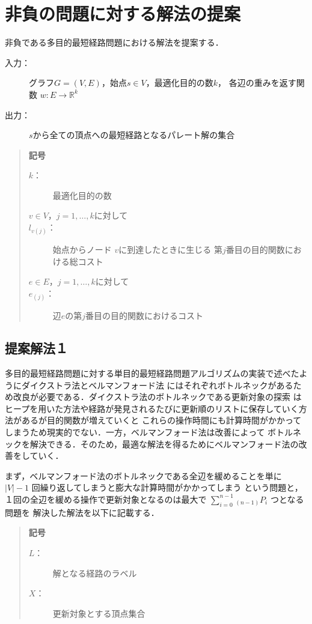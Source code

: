 \documentclass[12pt]{optlab-bachelor}
\begin{document}
\section{非負の問題に対する解法の提案}
非負である多目的最短経路問題における解法を提案する．
\begin{description}
  \item[入力：] グラフ$G=(V,E)$，始点$s \in V$，最適化目的の数$k$，
  各辺の重みを返す関数 $w : E \to \mathbb{R}^k$
  \item[出力：] $s$から全ての頂点への最短経路となるパレート解の集合
\end{description}
\begin{quote}
  \textbf{記号}
  \begin{description}
    \item[$k$：] 最適化目的の数
    \item[$v \in V$，$j = 1 , \ldots , k$に対して]
    \item[$l_{v(j)}$：] 始点からノード $v$に到達したときに生じる
    第$j$番目の目的関数における総コスト
    \item[$e \in E$，$j = 1 , \ldots , k$に対して]
    \item[$e_{(j)}$：] 辺$e$の第$j$番目の目的関数におけるコスト
  \end{description}
\end{quote}

\subsection{提案解法１}
多目的最短経路問題に対する単目的最短経路問題アルゴリズムの実装で述べたようにダイクストラ法とベルマンフォード法
にはそれぞれボトルネックがあるため改良が必要である．ダイクストラ法のボトルネックである更新対象の探索
はヒープを用いた方法や経路が発見されるたびに更新順のリストに保存していく方法があるが目的関数が増えていくと
これらの操作時間にも計算時間がかかってしまうため現実的でない．一方，ベルマンフォード法は改善によって
ボトルネックを解決できる．そのため，最適な解法を得るためにベルマンフォード法の改善をしていく．

まず，ベルマンフォード法のボトルネックである全辺を緩めることを単に $|V|-1$ 回繰り返してしまうと膨大な計算時間がかかってしまう
という問題と，１回の全辺を緩める操作で更新対象となるのは最大で $\displaystyle \sum_{i=0}^{n-1} {}_{(n-1)}P_i$ つとなる問題を
解決した解法を以下に記載する．


\begin{quote}
  \textbf{記号}
  \begin{description}
    \item[$L$：] 解となる経路のラベル
    \item[$X$：] 更新対象とする頂点集合
  \end{description}
\end{quote}
\end{document}
